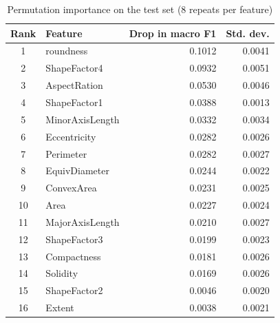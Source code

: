 \begin{table}[htbp]
\centering
\footnotesize
\caption{Permutation importance on the test set (8 repeats per feature)}
\label{tab:permutation}
\begin{tabular}{clrr}
\toprule
Rank & Feature & Drop in macro F1 & Std. dev. \\
\midrule
1 & roundness & 0.1012 & 0.0041 \\
2 & ShapeFactor4 & 0.0932 & 0.0051 \\
3 & AspectRation & 0.0530 & 0.0046 \\
4 & ShapeFactor1 & 0.0388 & 0.0013 \\
5 & MinorAxisLength & 0.0332 & 0.0034 \\
6 & Eccentricity & 0.0282 & 0.0026 \\
7 & Perimeter & 0.0282 & 0.0027 \\
8 & EquivDiameter & 0.0244 & 0.0022 \\
9 & ConvexArea & 0.0231 & 0.0025 \\
10 & Area & 0.0227 & 0.0024 \\
11 & MajorAxisLength & 0.0210 & 0.0027 \\
12 & ShapeFactor3 & 0.0199 & 0.0023 \\
13 & Compactness & 0.0181 & 0.0026 \\
14 & Solidity & 0.0169 & 0.0026 \\
15 & ShapeFactor2 & 0.0046 & 0.0020 \\
16 & Extent & 0.0038 & 0.0021 \\
\bottomrule
\end{tabular}
\end{table}
